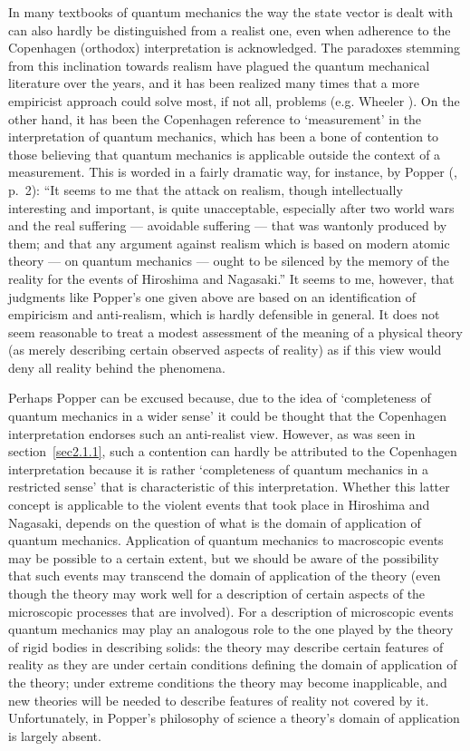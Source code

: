 \documentclass[12pt]{article}
\begin{document}
In many textbooks of quantum mechanics the way the state vector is
dealt with can also hardly be distinguished from a realist one,
even when adherence to the Copenhagen (orthodox) interpretation is
acknowledged. The paradoxes stemming from this inclination towards
realism have plagued the quantum mechanical literature over the
years, and it has been realized many times that a more empiricist
approach could solve most, if not all, problems (e.g. Wheeler
\cite{Wheeler79}). On the other hand, it has been the Copenhagen
reference to `measurement' in the interpretation of quantum
mechanics, which has been a bone of contention to those believing
that quantum mechanics is applicable outside the context of a
measurement. This is worded in a fairly dramatic way, for
instance, by Popper (\cite{Pop}, p.~2): ``It seems to me that the
attack on realism, though intellectually interesting and
important, is quite unacceptable, especially after two world wars
and the real suffering --- avoidable suffering --- that was wantonly
produced by them; and that any argument against realism which is
based on modern atomic theory --- on quantum mechanics --- ought to be
silenced by the memory of the reality for the events of Hiroshima
and Nagasaki.'' It seems to me, however, that judgments like
Popper's one given above are based on an identification of
empiricism and anti-realism, which is hardly defensible in
general. It does not seem reasonable to treat a modest assessment
of the meaning of a physical theory (as merely describing certain
observed aspects of reality) as if this view would deny all
reality behind the phenomena.

Perhaps Popper can be excused because, due to the idea of
`completeness of quantum mechanics in a wider sense' it could be
thought that the Copenhagen interpretation endorses such an
anti-realist view. However, as was seen in section~\ref{sec2.1.1},
such a contention can hardly be attributed to the Copenhagen
interpretation because it is rather `completeness of quantum
mechanics in a restricted sense' that is characteristic of this
interpretation. Whether this latter concept is applicable to the
violent events that took place in Hiroshima and Nagasaki, depends
on the question of what is the domain of application of quantum
mechanics. Application of quantum mechanics to macroscopic events
may be possible to a certain extent, but we should be aware of the
possibility that such events may transcend the domain of
application of the theory (even though the theory may work well
for a description of certain aspects of the microscopic processes
that are involved). For a description of microscopic events
quantum mechanics may play an analogous role to the one played by
the theory of rigid bodies in describing solids: the theory may
describe certain features of reality as they are under certain
conditions defining the domain of application of the theory; under
extreme conditions the theory may become inapplicable, and new
theories will be needed to describe features of reality not
covered by it. Unfortunately, in Popper's philosophy of science a
theory's domain of application is largely absent.
\end{document}
